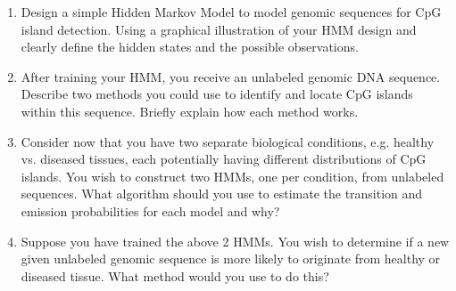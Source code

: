 \begin{enumerate}
\item Design a simple Hidden Markov Model to model genomic sequences for CpG island detection. Using a graphical illustration of your HMM design and clearly define the hidden states and the possible observations.

\begin{solution}

\end{solution}


\item After training your HMM, you receive an unlabeled genomic DNA sequence. Describe two methods you could use to identify and locate CpG islands within this sequence. Briefly explain how each method works.
\begin{solution}

\end{solution}

\item Consider now that you have two separate biological conditions, e.g. healthy vs. diseased tissues, each potentially having different distributions of CpG islands. You wish to construct two HMMs, one per condition, from unlabeled sequences. What algorithm should you use to estimate the transition and emission probabilities for each model and why?
\begin{solution}

\end{solution}

\item Suppose you have trained the above 2 HMMs. You wish to determine if a new given unlabeled genomic sequence is more likely to originate from healthy or diseased tissue. What method would you use to do this?
\begin{solution}

\end{solution}

\end{enumerate}